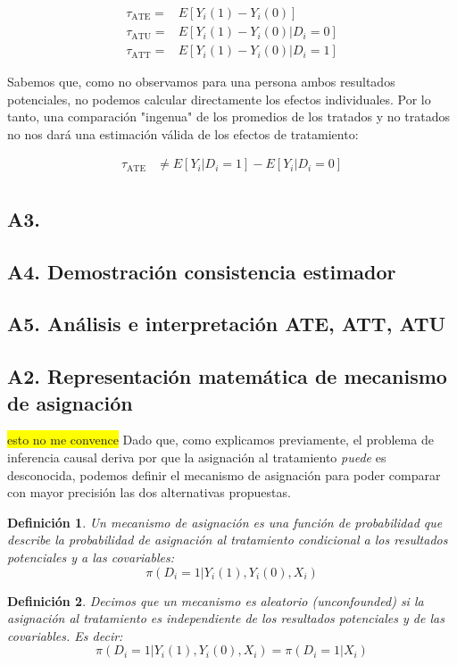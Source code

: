\documentclass[12pt, letter]{article}
\newtheorem{definition}{Definición}
\begin{document}
\begin{align}
\tau_{\text{ATE}} =& E[Y_i(1) - Y_i(0)] \\
\tau_{\text{ATU}} =& E[Y_i(1) - Y_i(0) | D_i = 0] \\
\tau_{\text{ATT}} =& E[Y_i(1) - Y_i(0) | D_i = 1]
\end{align}


Sabemos que, como no observamos para una persona ambos resultados potenciales, no podemos calcular directamente los efectos individuales. Por lo tanto, una comparación "ingenua" de los promedios de los tratados y no tratados no nos dará una estimación válida de los efectos de tratamiento:

\begin{align*}
\tau_{\text{ATE}} &\neq E[Y_i | D_i = 1] - E[Y_i | D_i = 0] \\
\end{align*}

\subsection{A3. }
\subsection{A4. Demostración consistencia estimador}
\subsection{A5. Análisis e interpretación ATE, ATT, ATU}
\subsection{A2. Representación matemática de mecanismo de asignación}

\colorbox{yellow}{esto no me convence}
Dado que, como explicamos previamente, el problema de inferencia causal deriva por que la asignación al tratamiento \textit{puede} es desconocida, podemos definir el mecanismo de asignación para poder comparar con mayor precisión las dos alternativas propuestas.

\begin{definition}
    Un mecanismo de asignación es una función de probabilidad que describe la probabilidad de asignación al tratamiento condicional a los resultados potenciales y a las covariables:
    $$\pi(D_i = 1 | Y_i(1), Y_i(0), X_i)$$
\end{definition}

\begin{definition}
    Decimos que un mecanismo es aleatorio (\textit{unconfounded}) si la asignación al tratamiento es independiente de los resultados potenciales y de las covariables. Es decir:
    $$\pi(D_i = 1 | Y_i(1), Y_i(0), X_i) = \pi(D_i = 1 | X_i)$$
\end{definition}
\end{document}
